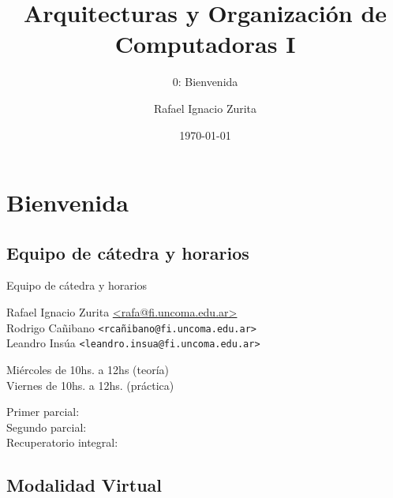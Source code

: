 \documentclass[aspectratio=169,compress]{beamer}
\title{Arquitecturas y Organización de Computadoras I}
\subtitle{0: Bienvenida}
\author{Rafael Ignacio Zurita}
\institute{Depto. Ingeniería de Computadoras}
\date{\today}
\begin{document}
\begin{frame}
\bigskip
  \maketitle
\end{frame}

\section{Bienvenida}
\subsection{Equipo de cátedra y horarios}

\begin{frame}{Equipo de cátedra y horarios}
  \begin{description}
  \item[Docentes]
\begin{small}
    Rafael Ignacio Zurita \href{mailto:rafa@fi.uncoma.edu.ar}{<rafa@fi.uncoma.edu.ar>}\\
    Rodrigo Cañibano \texttt{\footnotesize<rcañibano@fi.uncoma.edu.ar>}\\
    Leandro Insúa \texttt{\footnotesize<leandro.insua@fi.uncoma.edu.ar>}\\
\end{small}
  \item[Horarios]
        Miércoles de 10hs. a 12hs (teoría)\\
        Viernes de 10hs. a 12hs. (práctica)\\
  \item[Exámenes]
        Primer parcial:\\ 
        Segundo parcial:\\
        Recuperatorio integral:
  

  \end{description}
\end{frame}


\subsection{Modalidad Virtual}
\end{document}

